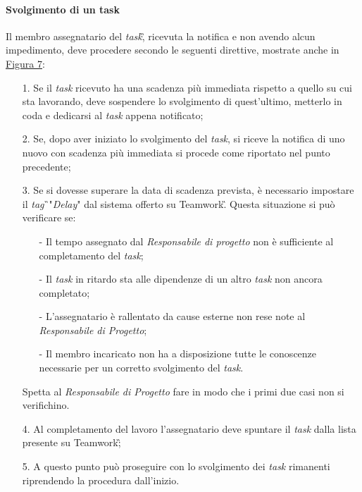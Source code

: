 \paragraph{Svolgimento di un task}
Il membro assegnatario del \textit{task}\G, ricevuta la notifica e non avendo alcun impedimento, deve procedere secondo le seguenti direttive, mostrate anche in \hyperref[sec:Figura7]{Figura 7}:
\begin{itemize}
\item [1.] Se il \textit{task} ricevuto ha una scadenza più immediata rispetto a quello su cui sta lavorando, deve sospendere lo svolgimento di quest'ultimo, metterlo in coda e dedicarsi al \textit{task} appena notificato;
\item [2.] Se, dopo aver iniziato lo svolgimento del \textit{task}, si riceve la notifica di uno nuovo con scadenza più immediata si procede come riportato nel punto precedente;
\item [3.] Se si dovesse superare la data di scadenza prevista, è necessario impostare il \textit{tag}\G\ "\textit{Delay}" dal sistema offerto su Teamwork\G. Questa situazione si può verificare se:
\begin{itemize}
\item [-] Il tempo assegnato dal \textit{Responsabile di progetto} non è sufficiente al completamento del \textit{task};
\item [-] Il \textit{task} in ritardo sta alle dipendenze di un altro \textit{task} non ancora completato;
\item [-] L'assegnatario è rallentato da cause esterne non rese note al \textit{Responsabile di Progetto};
\item [-] Il membro incaricato non ha a disposizione tutte le conoscenze necessarie per un corretto svolgimento del \textit{task}.
\end{itemize}
Spetta al \textit{Responsabile di Progetto} fare in modo che i primi due casi non si verifichino.

\item [4.] Al completamento del lavoro l'assegnatario deve spuntare il \textit{task} dalla lista presente su Teamwork\G;
\item [5.] A questo punto può proseguire con lo svolgimento dei \textit{task} rimanenti riprendendo la procedura dall'inizio.
\end{itemize}


